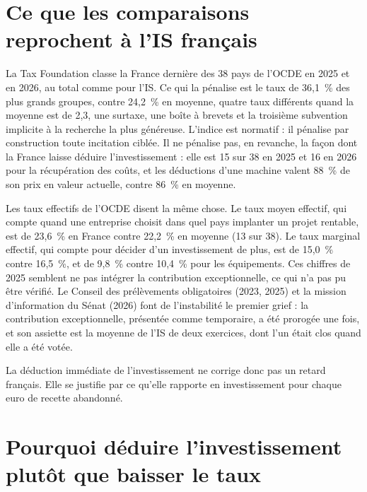 \documentclass[11pt,a4paper]{article}
\begin{document}
\section{Ce que les comparaisons reprochent à l'IS français}

La Tax Foundation classe la France dernière des 38 pays de l'OCDE en 2025 et en 2026, au total comme pour
l'IS. Ce qui la pénalise est le taux de 36,1~\% des plus grands groupes, contre 24,2~\% en moyenne, quatre taux
différents quand la moyenne est de 2,3, une surtaxe, une boîte à brevets et la troisième subvention implicite
à la recherche la plus généreuse. L'indice est normatif : il pénalise par construction toute incitation
ciblée. Il ne pénalise pas, en revanche, la façon dont la France laisse déduire l'investissement : elle est
15 sur 38 en 2025 et 16 en 2026 pour la récupération des coûts, et les déductions d'une machine valent 88~\% de son prix en
valeur actuelle, contre 86~\% en moyenne.

Les taux effectifs de l'OCDE disent la même chose. Le taux moyen effectif, qui compte quand une entreprise
choisit dans quel pays implanter un projet rentable, est de 23,6~\% en France contre 22,2~\% en moyenne
(13 sur 38). Le taux marginal effectif, qui compte pour décider d'un investissement de plus, est de
15,0~\% contre 16,5~\%, et de 9,8~\% contre 10,4~\% pour les équipements. Ces chiffres de 2025 semblent ne pas
intégrer la contribution exceptionnelle, ce qui n'a pas pu être vérifié. Le Conseil des prélèvements
obligatoires (2023, 2025) et la mission d'information du Sénat (2026) font de l'instabilité le premier
grief : la contribution exceptionnelle, présentée comme temporaire, a été prorogée une fois, et son assiette
est la moyenne de l'IS de deux exercices, dont l'un était clos quand elle a été votée.

La déduction immédiate de l'investissement ne corrige donc pas un retard français. Elle se justifie par ce
qu'elle rapporte en investissement pour chaque euro de recette abandonné.

\section{Pourquoi déduire l'investissement plutôt que baisser le taux}
\end{document}

